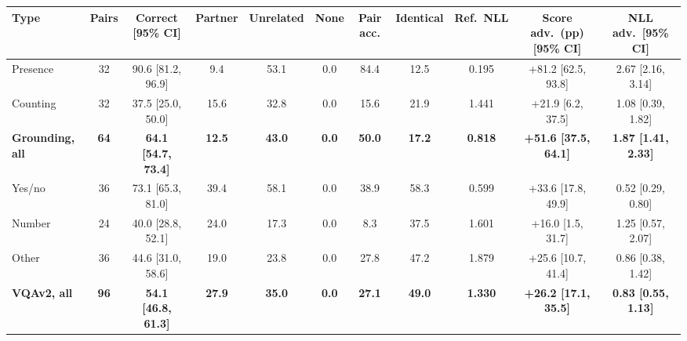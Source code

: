 \begin{tabular}{lcccccccccc}
\toprule
Type & Pairs & Correct [95\% CI] & Partner & Unrelated & None & Pair acc. & Identical & Ref.\ NLL & Score adv.\ (pp) [95\% CI] & NLL adv.\ [95\% CI] \\
\midrule
Presence & 32 & 90.6 [81.2, 96.9] & 9.4 & 53.1 & 0.0 & 84.4 & 12.5 & 0.195 & +81.2 [62.5, 93.8] & 2.67 [2.16, 3.14] \\
Counting & 32 & 37.5 [25.0, 50.0] & 15.6 & 32.8 & 0.0 & 15.6 & 21.9 & 1.441 & +21.9 [6.2, 37.5] & 1.08 [0.39, 1.82] \\
\textbf{Grounding, all} & \textbf{64} & \textbf{64.1 [54.7, 73.4]} & \textbf{12.5} & \textbf{43.0} & \textbf{0.0} & \textbf{50.0} & \textbf{17.2} & \textbf{0.818} & \textbf{+51.6 [37.5, 64.1]} & \textbf{1.87 [1.41, 2.33]} \\
Yes/no & 36 & 73.1 [65.3, 81.0] & 39.4 & 58.1 & 0.0 & 38.9 & 58.3 & 0.599 & +33.6 [17.8, 49.9] & 0.52 [0.29, 0.80] \\
Number & 24 & 40.0 [28.8, 52.1] & 24.0 & 17.3 & 0.0 & 8.3 & 37.5 & 1.601 & +16.0 [1.5, 31.7] & 1.25 [0.57, 2.07] \\
Other & 36 & 44.6 [31.0, 58.6] & 19.0 & 23.8 & 0.0 & 27.8 & 47.2 & 1.879 & +25.6 [10.7, 41.4] & 0.86 [0.38, 1.42] \\
\textbf{VQAv2, all} & \textbf{96} & \textbf{54.1 [46.8, 61.3]} & \textbf{27.9} & \textbf{35.0} & \textbf{0.0} & \textbf{27.1} & \textbf{49.0} & \textbf{1.330} & \textbf{+26.2 [17.1, 35.5]} & \textbf{0.83 [0.55, 1.13]} \\
\bottomrule
\end{tabular}